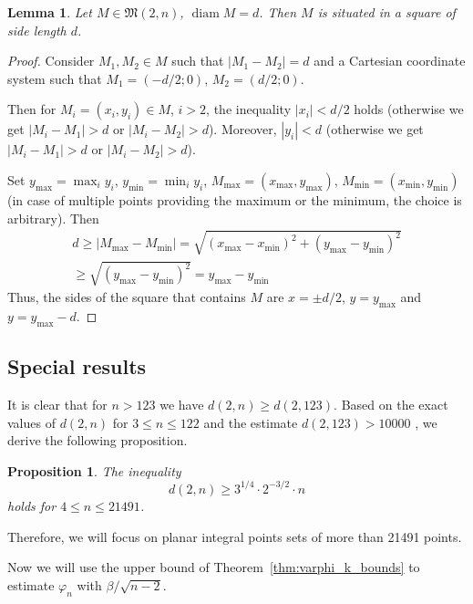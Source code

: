 \documentclass[a4paper,14pt]{article} %
\theoremstyle{plain}
\newtheorem{lemma}[theorem]{Lemma}
\newtheorem{proposition}[theorem]{Proposition}
\theoremstyle{definition}
\begin{document}
\begin{lemma}
	\cite[Lemma 4]{our-vmmsh-2018-translit}
	\label{lem:square_container}
	Let $M\in\mathfrak{M}(2,n)$, $\operatorname{diam} M = d$.
	Then $M$ is situated in a square of side length $d$.
\end{lemma}

\begin{proof}
	Consider $M_1, M_2 \in M$ such that $|M_1 - M_2| = d$
	and a Cartesian coordinate system such that
	$M_1 = (-d/2; 0)$, $M_2 = (d/2; 0)$.

	Then for $M_i =(x_i, y_i)\in M$, $i > 2$,
	the inequality $|x_i| < d/2$ holds
	(otherwise we get $|M_i - M_1| > d$ or $|M_i - M_2| > d$).
	Moreover, $|y_i| < d$ (otherwise we get $|M_i - M_1| > d$ or $|M_i - M_2| > d$).

	Set $y_{\max} = \max_{i} y_i$, $y_{\min} = \min_{i} y_i$, $M_{\max}=(x_{\max}, y_{\max})$, $M_{\min}=(x_{\min}, y_{\min})$
	(in case of multiple points providing the maximum or the minimum, the choice is arbitrary).
	Then
	\begin{multline}
		d \geq |M_{\max} - M_{\min}| = \sqrt{(x_{\max} - x_{\min})^2 + (y_{\max} - y_{\min})^2}
		\\\geq
		\sqrt{(y_{\max} - y_{\min})^2} =
		y_{\max} - y_{\min}
	\end{multline}
	Thus, the sides of the square that contains $M$ are $x=\pm d/2$,
	$y=y_{\max}$ and $y=y_{\max} - d$.
\end{proof}

\subsection{Special results}

It is clear that for $n>123$ we have $d(2,n) \geq d(2,123)$.
Based on the exact values of $d(2,n)$ for $ 3 \leq n\leq 122$ and the estimate $d(2,123)>10000$
\cite{kurz2008bounds}, we derive the following proposition.
\begin{proposition}
	\label{obs:4_leq_n_leq_21491}
	The inequality
	\begin{equation}
		d(2,n) \geq 3^{1/4}\cdot2^{-3/2} \cdot n
	\end{equation}
	holds for $4 \leq n \leq 21491$.
\end{proposition}

Therefore, we will focus on planar integral points sets of more than 21491 points.


Now we will use the upper bound of Theorem~\ref{thm:varphi_k_bounds}
to estimate $\varphi_n$ with $\beta/\sqrt{n-2}$.
\end{document}
